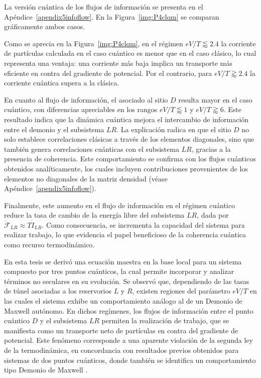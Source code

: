 La versión cuántica de los flujos de información se presenta en el Apéndice~\ref{apendix5infoflow}. En la Figura~\ref{img:P4clqm} se comparan gráficamente ambos casos.


Como se aprecia en la Figura~\ref{img:P4clqm}, en el régimen $eV/T\lessapprox 2.4$ la corriente de partículas calculada en el caso cuántico es menor que en el caso clásico, lo cual representa una ventaja: una corriente más baja implica un transporte más eficiente en contra del gradiente de potencial. Por el contrario, para $eV/T \gtrapprox 2.4$ la corriente cuántica supera a la clásica. 

En cuanto al flujo de información, el asociado al sitio $D$ resulta mayor en el caso cuántico, con diferencias apreciables en los rangos $eV/T \lessapprox 1$ y $eV/T \gtrapprox 6$. Este resultado indica que la dinámica cuántica mejora el intercambio de información entre el demonio y el subsistema $LR$. La explicación radica en que el sitio $D$ no solo establece correlaciones clásicas a través de los elementos diagonales, sino que también genera correlaciones cuánticas con el subsistema $LR$, gracias a la presencia de coherencia. Este comportamiento se confirma con los flujos cuánticos obtenidos analíticamente, los cuales incluyen contribuciones provenientes de los elementos no diagonales de la matriz densidad (véase Apéndice~\ref{apendix5infoflow}).

Finalmente, este aumento en el flujo de información en el régimen cuántico reduce la tasa de cambio de la energía libre del subsistema $LR$, dada por $\dot{\mathcal{F}}_{LR} \approx T\dot{I}_{LR}$. Como consecuencia, se incrementa la capacidad del sistema para realizar trabajo, lo que evidencia el papel beneficioso de la coherencia cuántica como recurso termodinámico.

\label{sec5:demonio}


En esta tesis se derivó una ecuación maestra en la base local para un sistema compuesto por tres puntos cuánticos, la cual permite incorporar y analizar términos no seculares en su evolución. Se observó que, dependiendo de las tasas de túnel asociadas a los reservorios $L$ y $R$, existen regiones del parámetro $eV/T$ en las cuales el sistema exhibe un comportamiento análogo al de un Demonio de Maxwell autónomo. En dichos regímenes, los flujos de información entre el punto cuántico $D$ y el subsistema $LR$ permiten la realización de trabajo, que se manifiesta como un transporte neto de partículas en contra del gradiente de potencial. Este fenómeno corresponde a una aparente violación de la segunda ley de la termodinámica, en concordancia con resultados previos obtenidos para sistemas de dos puntos cuánticos, donde también se identifica un comportamiento tipo Demonio de Maxwell \cite{horowitz2014thermodynamics}.

